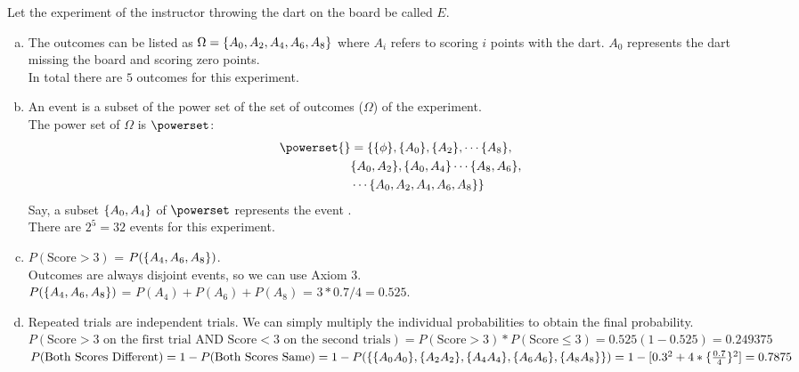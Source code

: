 Let the experiment of the instructor throwing the dart on the board be called $E$.
\begin{enumerate}[a.]
	\item The outcomes can be listed as $\Omega = \{A_0, A_2, A_4, A_6, A_8\}$ where $A_i$ refers to scoring $i$ points with the dart. $A_0$ represents the dart missing the board and scoring zero points. \\
	In total there are $5$ outcomes for this experiment.
	\item An event is a subset of the power set of the set of outcomes ($\Omega$) of the experiment.\\
	The power set of $\Omega$ is $\powerset$: 
	\begin{align}
		\powerset{} &= \{\set\phi, \set{A_0}, \set{ A_2}, \cdots  \set{A_8}, \nonumber\\
		& \set{A_0, A_2}, \set{A_0, A_4} \cdots \set{A_8, A_6}, \nonumber \\ 
		& \cdots \set{A_0, A_2, A_4, A_6, A_8}\} \nonumber 
	\end{align}
	Say, a subset $\{A_0, A_4\}$ of $\powerset$ represents the event .\\
	There are $2^5 = 32$ events for this experiment.
	\item $P(\text{Score} > 3)$ = $P(\{A_4, A_6, A_8\})$.\\ Outcomes are always disjoint events, so we can use Axiom 3. \\
	$P(\{A_4, A_6, A_8\})$ = $P(A_4) + P(A_6) + P(A_8)$ = $3*0.7/4 = 0.525$.
	\item Repeated trials are independent trials. We can simply multiply the individual probabilities to obtain the final probability. \\
	$P(\text{Score} > 3 \text{ on the first trial AND Score} < 3 \text{ on the second trials}) = P(\text{Score} > 3)*P(\text{Score} \leq 3) = 0.525(1-0.525) = 0.249375$\\[10pt]
	$P(\text{Both Scores Different}) = 1 - P(\text{Both Scores Same}) \\
	= 1 - P(\{\{A_0 A_0\}, \{A_2 A_2\}, \{A_4 A_4\}, \{A_6 A_6\}, \{A_8 A_8\}\}) \\
	= 1 - [0.3^2 + 4*\{\frac{0.7}{4}\}^2] = 0.7875$
\end{enumerate}